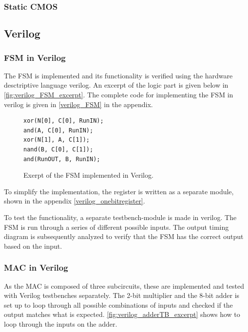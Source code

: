 \subsubsection{Static CMOS}

\subsection{Verilog}

\subsubsection{FSM in Verilog}
\label{subsec:fsm_verilog}

The FSM is implemented and its functionality is verified using the hardware desctriptive language verilog. An excerpt of the logic part is given below in \autoref{fig:verilog_FSM_excerpt}. The complete code for implementing the FSM in verilog is given in \autoref{verilog_FSM} in the appendix.


\begin{figure}[H]
\centering
\caption{Exerpt of the FSM implemented in Verilog.}
\label{fig:verilog_FSM_excerpt}
\begin{minipage}{0.33\textwidth}
\begin{lstlisting}[style=verilogStyle]
xor(N[0], C[0], RunIN);
and(A, C[0], RunIN);
xor(N[1], A, C[1]);
nand(B, C[0], C[1]);
and(RunOUT, B, RunIN);
\end{lstlisting}
\end{minipage}
\end{figure}


To simplify the implementation, the register is written as a separate module, shown in the appendix \autoref{verilog_onebitregister}.

To test the functionality, a separate testbench-module is made in verilog. The FSM is run through a series of different possible inputs. The output timing diagram is subsequently analyzed to verify that the FSM has the correct output based on the input.

\subsubsection{MAC in Verilog}
\label{subsubsec:MAC_in_verilog}

As the MAC is composed of three subcircuits, these are implemented and tested with Verilog testbenches separately. The 2-bit multiplier and the 8-bit adder is set up to loop through all possible combinations of inputs and checked if the output matches what is expected. \autoref{fig:verilog_adderTB_excerpt} shows how to loop through the inputs on the adder.

